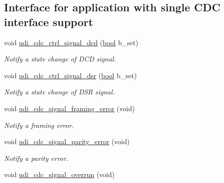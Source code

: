 \subsection*{Interface for application with single C\-D\-C interface support}
\begin{DoxyCompactItemize}
\item 
void \hyperlink{group__udi__cdc__group_ga5507164c7c4ff2c9b94af48229dc0c3c}{udi\-\_\-cdc\-\_\-ctrl\-\_\-signal\-\_\-dcd} (\hyperlink{group__group__xmega__utils_ga97a80ca1602ebf2303258971a2c938e2}{bool} b\-\_\-set)
\begin{DoxyCompactList}\small\item\em Notify a state change of D\-C\-D signal. \end{DoxyCompactList}\item 
void \hyperlink{group__udi__cdc__group_ga6b34b223f6c03cd35fc16d29cb9cfb78}{udi\-\_\-cdc\-\_\-ctrl\-\_\-signal\-\_\-dsr} (\hyperlink{group__group__xmega__utils_ga97a80ca1602ebf2303258971a2c938e2}{bool} b\-\_\-set)
\begin{DoxyCompactList}\small\item\em Notify a state change of D\-S\-R signal. \end{DoxyCompactList}\item 
\hypertarget{group__udi__cdc__group_gaf62c55c329d7e7ff3913274b124e54aa}{void \hyperlink{group__udi__cdc__group_gaf62c55c329d7e7ff3913274b124e54aa}{udi\-\_\-cdc\-\_\-signal\-\_\-framing\-\_\-error} (void)}\label{group__udi__cdc__group_gaf62c55c329d7e7ff3913274b124e54aa}

\begin{DoxyCompactList}\small\item\em Notify a framing error. \end{DoxyCompactList}\item 
\hypertarget{group__udi__cdc__group_gab6dd1be8afa57a1bece870338bdc5f74}{void \hyperlink{group__udi__cdc__group_gab6dd1be8afa57a1bece870338bdc5f74}{udi\-\_\-cdc\-\_\-signal\-\_\-parity\-\_\-error} (void)}\label{group__udi__cdc__group_gab6dd1be8afa57a1bece870338bdc5f74}

\begin{DoxyCompactList}\small\item\em Notify a parity error. \end{DoxyCompactList}\item 
\hypertarget{group__udi__cdc__group_ga7730a564c9cb117af611958500a4fa7f}{void \hyperlink{group__udi__cdc__group_ga7730a564c9cb117af611958500a4fa7f}{udi\-\_\-cdc\-\_\-signal\-\_\-overrun} (void)}\label{group__udi__cdc__group_ga7730a564c9cb117af611958500a4fa7f}


\end{DoxyCompactItemize}
